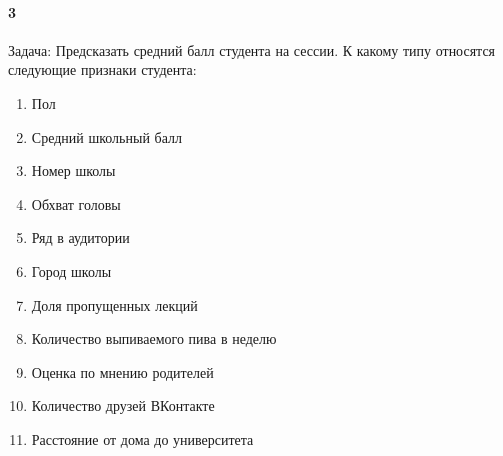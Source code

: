 \documentclass[a4paper,12pt]{article}
\begin{document}
  \paragraph{3} Задача: Предсказать средний балл студента на сессии. К какому типу относятся следующие признаки студента:
    \begin{enumerate}
      \item Пол\hrulefill
      \item Средний школьный балл\hrulefill
      \item Номер школы\hrulefill
      \item Обхват головы\hrulefill
      \item Ряд в аудитории\hrulefill
      \item Город школы\hrulefill
      \item Доля пропущенных лекций\hrulefill
      \item Количество выпиваемого пива в неделю\hrulefill
      \item Оценка по мнению родителей\hrulefill
      \item Количество друзей ВКонтакте\hrulefill
      \item Расстояние от дома до университета\hrulefill
    \end{enumerate}
\end{document}
